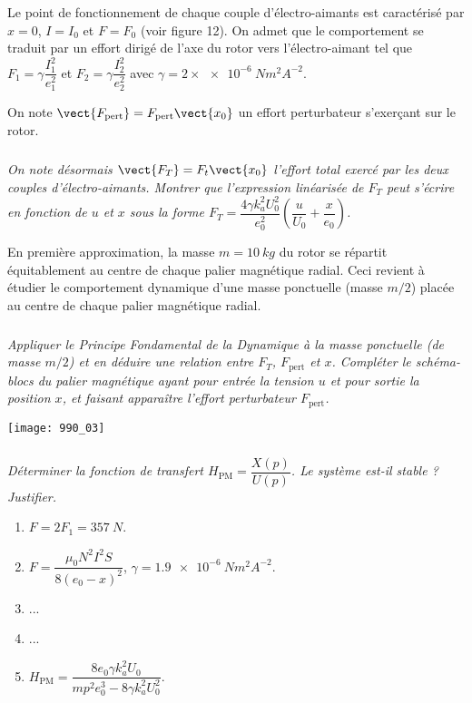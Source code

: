 Le point de fonctionnement de chaque couple d’électro-aimants est caractérisé
par $x=0$, $I=I_0$ et $F=F_0$ (voir figure 12). On admet que le comportement se
traduit par un effort dirigé de l'axe du rotor vers l'électro-aimant tel que $F_1 = \gamma \dfrac{I_1^2}{e_1^2}$ et $F_2=\gamma \dfrac{I_2^2}{e_2^2}$ avec $\gamma=2\times \SI{e-6}{Nm^2A^{-2}}$.

On note $\vect{F_{\text{pert}}} = F_{\text{pert}}\vect{x_0}$ un effort perturbateur s'exerçant sur le rotor.


\subparagraph{}
\textit{On note désormais $\vect{F_T}=F_t\vect{x_0}$ l'effort total exercé par les deux couples
d'électro-aimants. Montrer que l'expression linéarisée de $F_T$ peut s'écrire en
fonction de $u$ et $x$ sous la forme $F_T = \dfrac{4\gamma k_a^2 U_0^2}{e_0^2} \left(\dfrac{u}{U_0} + \dfrac{x}{e_0} \right)$.}
\ifprof
\begin{corrige}
\end{corrige}
\else
\fi


En première approximation, la masse $m=\SI{10}{kg}$ du rotor se répartit équitablement
au centre de chaque palier magnétique radial. Ceci revient à étudier le
comportement dynamique d'une masse ponctuelle (masse $m/2$) placée au centre
de chaque palier magnétique radial.

\subparagraph{}
\textit{Appliquer le Principe Fondamental de la Dynamique à la masse ponctuelle
(de masse $m/2$) et en déduire une relation entre $F_T$, $F_{\text{pert}}$ et $x$. Compléter
le schéma-blocs du palier magnétique ayant pour entrée la tension $u$ et pour sortie la position $x$, et faisant apparaître l'effort perturbateur $F_{\text{pert}}$.}
\ifprof
\begin{corrige}
\end{corrige}
\else
\fi


\begin{center}
\texttt{[image: 990\_03]}
\end{center}


\subparagraph{}
\textit{Déterminer la fonction de transfert $H_{\text{PM}}=\dfrac{X(p)}{U(p)}$. Le système est-il stable ? Justifier.}
\ifprof
\begin{corrige}
\end{corrige}
\else
\fi

\begin{enumerate}
\item $F=2F_1=\SI{357}{N}$.
\item $F=\dfrac{\mu_0 N^2 I^2 S}{8\left(e_0 - x  \right)^2}$, $\gamma = \SI{1,9e-6}{Nm^2A^{-2}}$.
\item ...
\item ...
\item $H_{\text{PM}}=\dfrac{8e_0\gamma k_a^2 U_0}{mp^2e_0^3-8\gamma k_a^2 U_0^2}$.
\end{enumerate}
